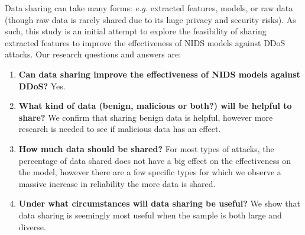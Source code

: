 \begin{intro}
Data sharing can take many forms: \textit{e.g.} extracted features, models, or raw data (though raw data is rarely shared due to its huge privacy and security risks). As such, this study is an initial attempt to explore the feasibility of sharing extracted features to improve the effectiveness of NIDS models against DDoS attacks. Our research questions and answers are:
\begin{enumerate}
    \item \textbf{Can data sharing improve the effectiveness of NIDS models against DDoS?} Yes.
    \item \textbf{What kind of data (benign, malicious or both?) will be helpful to share?} We confirm that sharing benign data is helpful, however more research is needed to see if malicious data has an effect.
    \item \textbf{How much data should be shared?} For most types of attacks, the percentage of data shared does not have a big effect on the effectiveness on the model, however there are a few specific types for which we observe a massive increase in reliability the more data is shared.
    \item \textbf{Under what circumstances will data sharing be useful?} We show that data sharing is seemingly most useful when the sample is both large and diverse.
    
\end{enumerate}








\end{intro}
